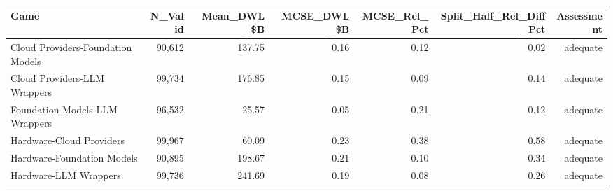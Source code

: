 

\begin{tabular}{@{}lrrrrrr@{}}
\toprule
Game & N\_Valid & Mean\_DWL\_\$B & MCSE\_DWL\_\$B & MCSE\_Rel\_Pct & Split\_Half\_Rel\_Diff\_Pct & Assessment \\
\midrule
Cloud Providers-Foundation Models & 90,612 & 137.75 & 0.16 & 0.12 & 0.02 & adequate \\
Cloud Providers-LLM Wrappers & 99,734 & 176.85 & 0.15 & 0.09 & 0.14 & adequate \\
Foundation Models-LLM Wrappers & 96,532 & 25.57 & 0.05 & 0.21 & 0.12 & adequate \\
Hardware-Cloud Providers & 99,967 & 60.09 & 0.23 & 0.38 & 0.58 & adequate \\
Hardware-Foundation Models & 90,895 & 198.67 & 0.21 & 0.10 & 0.34 & adequate \\
Hardware-LLM Wrappers & 99,736 & 241.69 & 0.19 & 0.08 & 0.26 & adequate \\
\bottomrule
\end{tabular}